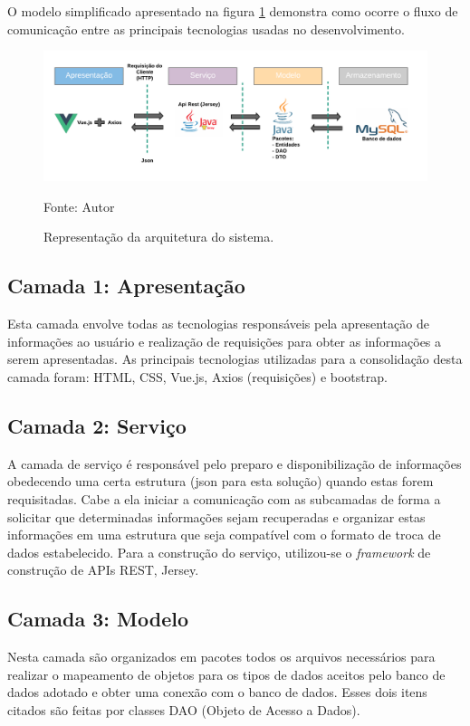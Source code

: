 O modelo simplificado apresentado na figura \ref{arquitetura} demonstra como ocorre o fluxo de comunicação entre as principais tecnologias
usadas no desenvolvimento.

\begin{figure}[h]
	\centering
	\includegraphics[keepaspectratio=true,scale=0.8]{figuras/arquitetura.png}
	\caption{Representação da arquitetura do sistema.}
	Fonte: {Autor}
	\label{arquitetura}
\end{figure}	

\subsection{Camada 1: Apresentação}
Esta camada envolve todas as tecnologias responsáveis pela apresentação de informações ao usuário e realização de requisições para obter as informações
a serem apresentadas. As principais tecnologias utilizadas para a consolidação desta camada foram: HTML, CSS, Vue.js, Axios (requisições) e bootstrap.

\subsection{Camada 2: Serviço}
A camada de serviço é responsável pelo preparo e disponibilização de informações obedecendo uma certa estrutura (json para esta solução) quando estas forem requisitadas. 
Cabe a ela iniciar a comunicação com as subcamadas de forma a solicitar que determinadas informações sejam recuperadas e organizar estas informações em uma estrutura que seja compatível
com o formato de troca de dados estabelecido. Para a construção do serviço, utilizou-se o \textit{framework} de construção de APIs REST, Jersey.

\subsection{Camada 3: Modelo}
Nesta camada são organizados em pacotes todos os arquivos necessários para realizar o mapeamento de objetos para os tipos de dados aceitos pelo banco de dados
adotado e obter uma conexão com o banco de dados. Esses dois itens citados são feitas por classes DAO (Objeto de Acesso a Dados).

